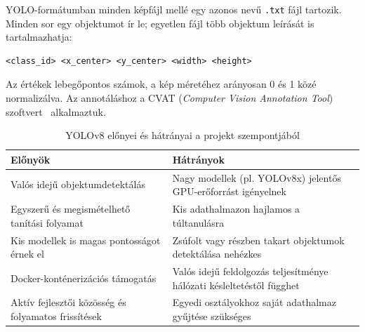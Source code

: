     YOLO-formátumban minden képfájl mellé egy azonos nevű \texttt{.txt} fájl tartozik. Minden sor egy objektumot ír le;
    egyetlen fájl több objektum leírását is tartalmazhatja:

    \begin{lstlisting}
<class_id> <x_center> <y_center> <width> <height>
    \end{lstlisting}

    Az értékek lebegőpontos számok, a kép méretéhez arányosan 0 és 1 közé normalizálva. Az annotáláshoz a CVAT
    (\textit{Computer Vision Annotation Tool}) szoftvert~\cite{cvat} alkalmaztuk.

    \begin{table}[H]
    \centering
    \caption{YOLOv8 előnyei és hátrányai a projekt szempontjából}
    \label{tab:yolo_elonyok_hatranyok}
    \renewcommand{\arraystretch}{1.4}
    \begin{tabular}{|p{}|p{}|}
        \hline
        \textbf{Előnyök} & \textbf{Hátrányok} \\
        \hline
        Valós idejű objektumdetektálás & Nagy modellek (pl. YOLOv8x) jelentős GPU-erőforrást igényelnek \\
        \hline
        Egyszerű és megismételhető tanítási folyamat & Kis adathalmazon hajlamos a túltanulásra \\
        \hline
        Kis modellek is magas pontosságot érnek el & Zsúfolt vagy részben takart objektumok detektálása nehézkes \\
        \hline
        Docker-konténerizációs támogatás & Valós idejű feldolgozás teljesítménye hálózati késleltetéstől függhet \\
        \hline
        Aktív fejlesztői közösség és folyamatos frissítések & Egyedi osztályokhoz saját adathalmaz gyűjtése szükséges \\
        \hline
    \end{tabular}
    \end{table}


